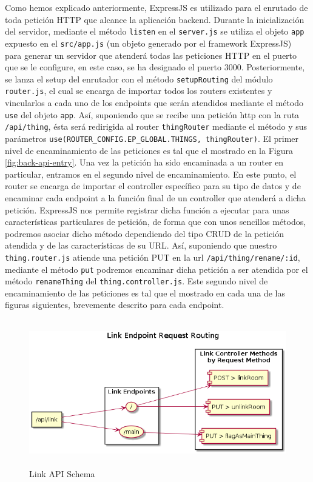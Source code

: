 Como hemos explicado anteriormente, ExpressJS es utilizado para el enrutado de toda petición HTTP que alcance la aplicación backend. Durante la inicialización del servidor, mediante el método \verb|listen| en el \verb|server.js| se utiliza el objeto \verb|app| expuesto en el \verb|src/app.js| (un objeto generado por el framework ExpressJS) para generar un servidor que atenderá todas las peticiones HTTP en el puerto que se le configure, en este caso, se ha designado el puerto 3000.
\vspace{0.5cm}
Posteriormente, se lanza el setup del enrutador con el método \verb|setupRouting| del módulo \verb|router.js|, el cual se encarga de importar todos los routers existentes y vincularlos a cada uno de los endpoints que serán atendidos mediante el método \verb|use| del objeto \verb|app|. Así, suponiendo que se recibe una petición http con la ruta \verb|/api/thing|, ésta será redirigida al router \verb|thingRouter| mediante el método y sus parámetros \verb|use(ROUTER_CONFIG.EP_GLOBAL.THINGS, thingRouter)|. El primer nivel de encaminamiento de las peticiones es tal que el mostrado en la Figura \ref{fig:back-api-entry}.
\vspace{0.5cm}
Una vez la petición ha sido encaminada a un router en particular, entramos en el segundo nivel de encaminamiento. En este punto, el router se encarga de importar el controller específico para su tipo de datos y de encaminar cada endpoint a la función final de un controller que atenderá a dicha petición. ExpressJS nos permite registrar dicha función a ejecutar para unas características particulares de petición, de forma que con unos sencillos métodos, podremos asociar dicho método dependiendo del tipo CRUD de la petición atendida y de las características de su URL. Así, suponiendo que nuestro \verb|thing.router.js| atiende una petición PUT en la url \verb|/api/thing/rename/:id|, mediante el método \verb|put| podremos encaminar dicha petición a ser atendida por el método \verb|renameThing| del \verb|thing.controller.js|. Este segundo nivel de encaminamiento de las peticiones es tal que el mostrado en cada una de las figuras siguientes, brevemente descrito para cada endpoint.

\begin{figure}[hbt!]
\centering
\includegraphics[height=2.5in]{figures/diagrams/back/router-flow/link-endpoints.png}
\caption[link-endpoints]{Link API Schema\footnotemark}
\end{figure}

